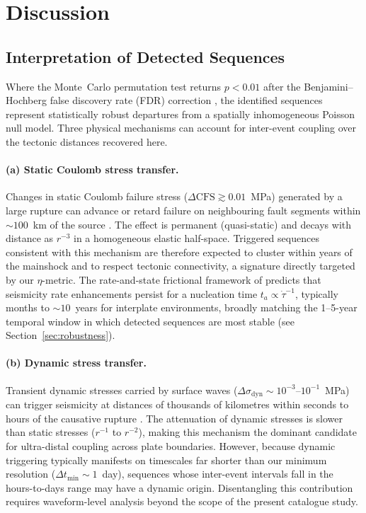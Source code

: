 \section{Discussion}
\label{sec:discussion}

\subsection{Interpretation of Detected Sequences}
\label{subsec:sequences_found}

Where the Monte~Carlo permutation test returns $p < 0.01$ after the
Benjamini--Hochberg false discovery rate (FDR) correction
\citep{BenjaminiHochberg1995}, the identified sequences represent
statistically robust departures from a spatially inhomogeneous Poisson
null model.  Three physical mechanisms can account for inter-event
coupling over the tectonic distances recovered here.

\paragraph{(a) Static Coulomb stress transfer.}
Changes in static Coulomb failure stress ($\Delta\mathrm{CFS} \gtrsim
0.01$~MPa) generated by a large rupture can advance or retard failure on
neighbouring fault segments within $\sim\!100$~km of the source
\citep{King1994, Stein1999}.  The effect is permanent (quasi-static)
and decays with distance as $r^{-3}$ in a homogeneous elastic half-space.
Triggered sequences consistent with this mechanism are therefore expected
to cluster within years of the mainshock and to respect tectonic
connectivity, a signature directly targeted by our $\eta$-metric.  The
rate-and-state frictional framework of \citet{Dieterich1994} predicts
that seismicity rate enhancements persist for a nucleation time
$t_a \propto \dot{\tau}^{-1}$, typically months to $\sim\!10$~years for
interplate environments, broadly matching the 1–5-year temporal window in
which detected sequences are most stable (see Section~\ref{sec:robustness}).

\paragraph{(b) Dynamic stress transfer.}
Transient dynamic stresses carried by surface waves ($\Delta\sigma_\mathrm{dyn}
\sim 10^{-3}$–$10^{-1}$~MPa) can trigger seismicity at distances of
thousands of kilometres within seconds to hours of the causative rupture
\citep{Hill1993, Gomberg2001, Brodsky2006}.  The attenuation of dynamic
stresses is slower than static stresses ($r^{-1}$ to $r^{-2}$), making
this mechanism the dominant candidate for ultra-distal coupling across
plate boundaries.  However, because dynamic triggering typically manifests
on timescales far shorter than our minimum resolution ($\Delta t_{\min}
\sim 1$~day), sequences whose inter-event intervals fall in the hours-to-days
range may have a dynamic origin.  Disentangling this contribution requires
waveform-level analysis beyond the scope of the present catalogue study.

